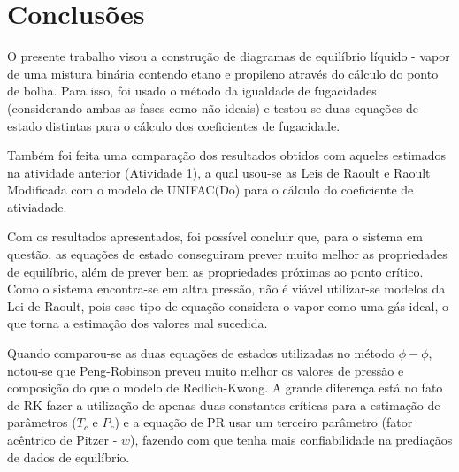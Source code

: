 \section{Conclusões} 

O presente trabalho visou a construção de diagramas de equilíbrio líquido -
vapor de uma mistura binária contendo etano e propileno através do cálculo do ponto de bolha. Para isso, foi usado o método da igualdade de fugacidades (considerando
ambas as fases como não ideais) e testou-se duas equações de estado distintas
para o cálculo dos coeficientes de fugacidade.

Também foi feita uma comparação dos resultados obtidos com aqueles estimados na
atividade anterior (Atividade 1), a qual usou-se as Leis de Raoult e
Raoult Modificada com o modelo de UNIFAC(Do) para o cálculo do coeficiente de
ativiadade.

Com os resultados apresentados, foi possível concluir que, para o sistema em
questão, as equações de estado conseguiram prever muito melhor as propriedades
de equilíbrio, além de prever bem as propriedades próximas ao ponto 
crítico.
Como o sistema encontra-se em altra pressão, não é viável utilizar-se modelos da Lei de Raoult, pois esse
tipo de equação considera o vapor como uma gás ideal, o que torna a
estimação dos valores mal sucedida.

Quando comparou-se as duas equações de estados utilizadas no método $\phi-\phi$,
notou-se que Peng-Robinson preveu muito melhor os valores de pressão e
composição do que o modelo de Redlich-Kwong. A grande diferença está no fato de 
RK fazer a utilização de apenas duas constantes críticas para a estimação de
parâmetros ($T_c$ e $P_c$) e a equação de PR usar um terceiro parâmetro (fator acêntrico 
de Pitzer - $w$), fazendo com que tenha mais confiabilidade na prediaçãos de
dados de equilíbrio.


